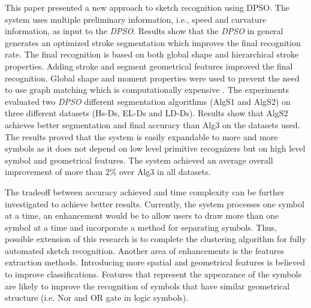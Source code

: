 \documentclass[preprint,10pt,5p,twocolumn]{elsarticle}
\begin{document}
This paper presented a new approach to sketch recognition using DPSO. The system uses multiple preliminary information, i.e., speed and curvature information, as input to the \textit{DPSO}. Results show that the \textit{DPSO} in general generates an optimized stroke segmentation which improves the final recognition rate.  The final recognition is based on both global shape and hierarchical stroke properties. Adding stroke and segment geometrical features improved the final recognition. Global shape and moment properties were used to prevent the need to use graph matching which is computationally expensive \cite{SketchRead2007}. The experiments evaluated two \textit{DPSO} different segmentation algorithms (AlgS1 and AlgS2) on three different datasets (Hs-Ds, EL-Ds and LD-Ds). Results show that AlgS2 achieves better segmentation and final accuracy than Alg3 \cite{earlyprocess} on the datasets used. The results proved that the system is easily expandable to more and more symbols as it does not depend on low level primitive recognizers but on high level symbol and geometrical features.  The system achieved an average overall improvement of more than 2\% over Alg3 in all datasets.  

  The tradeoff between accuracy achieved and time complexity can be further investigated to achieve better results. Currently, the system processes one symbol at a time, an enhancement would be to allow users to draw more than one symbol at a time and incorporate a method for separating symbols. Thus, possible extension of this research is to complete the clustering algorithm for fully automated sketch recognition. Another area of enhancements is the features extraction methods. Introducing more spatial and geometrical features is believed to improve classifications. Features that represent the appearance of the symbols are likely to improve the recognition of symbols that have similar geometrical structure (i.e. Nor and OR gate in logic symbols).  
  
%

\end{document}
